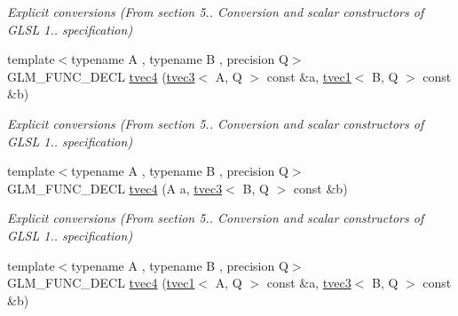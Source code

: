 \begin{DoxyCompactItemize}
\begin{DoxyCompactList}\small\item\em Explicit conversions (From section 5.. Conversion and scalar constructors of G\-L\-S\-L 1.. specification) \end{DoxyCompactList}\item 
\hypertarget{structglm_1_1tvec4_a4d3c30bcd12383fa93d156ed59b8352f}{{\footnotesize template$<$typename A , typename B , precision Q$>$ }\\G\-L\-M\-\_\-\-F\-U\-N\-C\-\_\-\-D\-E\-C\-L \hyperlink{structglm_1_1tvec4_a4d3c30bcd12383fa93d156ed59b8352f}{tvec4} (\hyperlink{structglm_1_1tvec3}{tvec3}$<$ A, Q $>$ const \&a, \hyperlink{structglm_1_1tvec1}{tvec1}$<$ B, Q $>$ const \&b)}\label{structglm_1_1tvec4_a4d3c30bcd12383fa93d156ed59b8352f}

\begin{DoxyCompactList}\small\item\em Explicit conversions (From section 5.. Conversion and scalar constructors of G\-L\-S\-L 1.. specification) \end{DoxyCompactList}\item 
\hypertarget{structglm_1_1tvec4_a6a9bbb826cdc21c87c62063f2af54671}{{\footnotesize template$<$typename A , typename B , precision Q$>$ }\\G\-L\-M\-\_\-\-F\-U\-N\-C\-\_\-\-D\-E\-C\-L \hyperlink{structglm_1_1tvec4_a6a9bbb826cdc21c87c62063f2af54671}{tvec4} (A a, \hyperlink{structglm_1_1tvec3}{tvec3}$<$ B, Q $>$ const \&b)}\label{structglm_1_1tvec4_a6a9bbb826cdc21c87c62063f2af54671}

\begin{DoxyCompactList}\small\item\em Explicit conversions (From section 5.. Conversion and scalar constructors of G\-L\-S\-L 1.. specification) \end{DoxyCompactList}\item 
\hypertarget{structglm_1_1tvec4_ab20c1af7c5f2f978165f0e0582641a52}{{\footnotesize template$<$typename A , typename B , precision Q$>$ }\\G\-L\-M\-\_\-\-F\-U\-N\-C\-\_\-\-D\-E\-C\-L \hyperlink{structglm_1_1tvec4_ab20c1af7c5f2f978165f0e0582641a52}{tvec4} (\hyperlink{structglm_1_1tvec1}{tvec1}$<$ A, Q $>$ const \&a, \hyperlink{structglm_1_1tvec3}{tvec3}$<$ B, Q $>$ const \&b)}\label{structglm_1_1tvec4_ab20c1af7c5f2f978165f0e0582641a52}


\end{DoxyCompactItemize}

